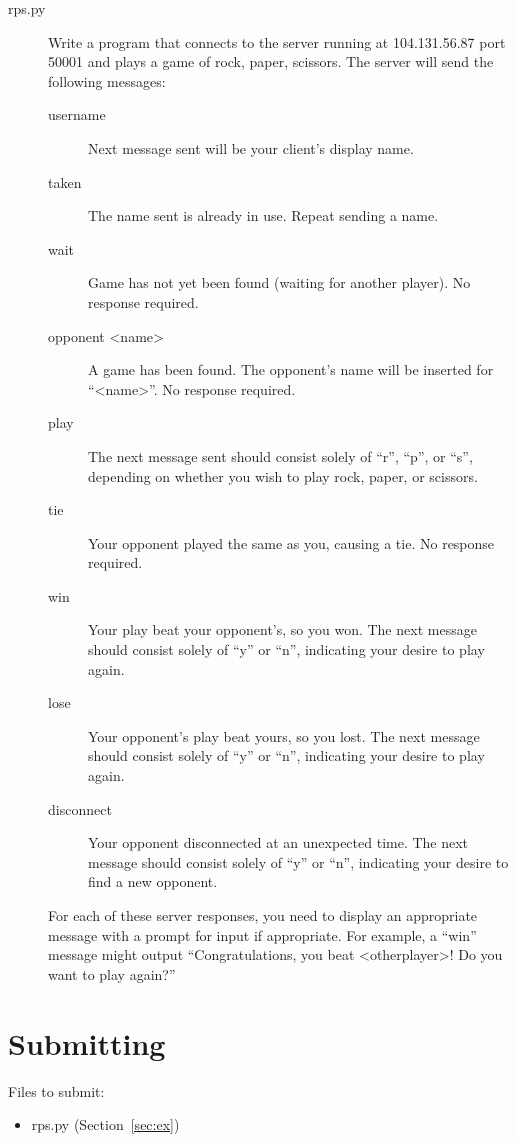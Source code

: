\documentclass[11pt]{cselabheader}
\begin{document}
\begin{description}
\item[rps.py] Write a program that connects to the server running at
  104.131.56.87 port 50001 and plays a game of rock, paper, scissors. The server
  will send the following messages:

  \begin{description}
    \item[username] Next message sent will be your client's display name.
    \item[taken] The name sent is already in use. Repeat sending a name.
    \item[wait] Game has not yet been found (waiting for another player). No
      response required.
    \item[opponent <name>] A game has been found. The opponent's name will be
      inserted for ``<name>''. No response required.
    \item[play] The next message sent should consist solely of ``r'', ``p'', or
      ``s'', depending on whether you wish to play rock, paper, or scissors.
    \item[tie] Your opponent played the same as you, causing a tie. No response
      required.
    \item[win] Your play beat your opponent's, so you won. The next
      message should consist solely of ``y'' or ``n'', indicating your desire to
      play again.
    \item[lose] Your opponent's play beat yours, so you lost. The next message
      should consist solely of ``y'' or ``n'', indicating your desire to play
      again.  
    \item[disconnect] Your opponent disconnected at an unexpected time.  The
      next message should consist solely of ``y'' or ``n'', indicating your
      desire to find a new opponent.
  \end{description}

  For each of these server responses, you need to display an appropriate message
  with a prompt for input if appropriate. For example, a ``win'' message might
  output ``Congratulations, you beat <otherplayer>! Do you want to play again?''
\end{description}

\pagebreak
\section{Submitting}

Files to submit:
\begin{itemize}
  \item rps.py (Section~\ref{sec:ex})
\end{itemize}
\end{document}
